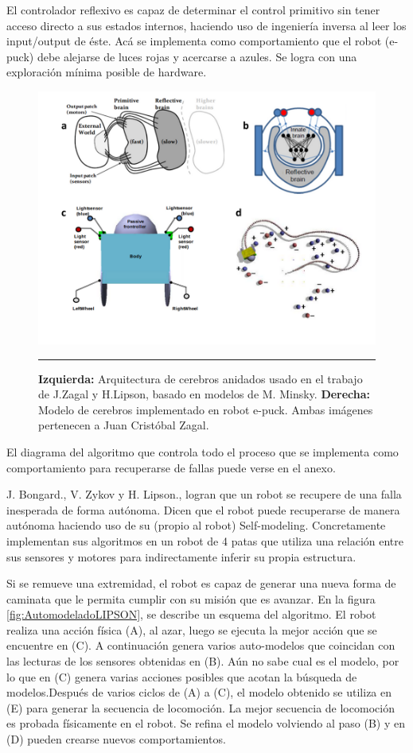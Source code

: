 El controlador reflexivo es capaz de determinar el control primitivo sin tener acceso directo a sus estados internos, haciendo uso de ingeniería inversa al leer los input/output de éste. Acá se implementa como comportamiento que el robot (e-puck) debe alejarse de luces rojas y acercarse a azules. Se logra con una exploración mínima posible de hardware.

\begin{figure}[htbp]
	\centering
		\includegraphics[width=\textwidth]{./Figures/automod.png}
		\rule{35em}{0.5pt}
	\caption[Automodelado]{\textbf{Izquierda:} Arquitectura de cerebros anidados usado en el trabajo de J.Zagal y H.Lipson, basado en modelos de M. Minsky. \textbf{Derecha:} Modelo de cerebros implementado en robot e-puck. Ambas imágenes  pertenecen a Juan Cristóbal Zagal.}
	\label{fig:AutomodeladoTest}
\end{figure}


El diagrama del algoritmo que controla todo el proceso que se implementa como comportamiento para recuperarse de fallas puede verse en el anexo.

J. Bongard., V. Zykov y H. Lipson., logran que un robot se recupere de una falla inesperada de forma autónoma. Dicen que el robot puede recuperarse de manera autónoma haciendo uso de su (propio al robot) Self-modeling. Concretamente implementan sus algoritmos en un robot de 4 patas que utiliza una relación entre sus sensores y motores para indirectamente inferir su propia estructura.


Si se remueve una extremidad, el robot es capaz de generar una nueva forma de caminata que le permita cumplir con su misión que es avanzar.
En la figura \ref{fig:AutomodeladoLIPSON}, se describe un esquema del algoritmo. El robot realiza una acción física (A), al azar, luego se ejecuta la mejor acción que se encuentre en (C). A continuación genera varios auto-modelos que coincidan con las lecturas de los sensores obtenidas en (B). Aún no sabe cual es el modelo, por lo que en (C) genera varias acciones posibles que acotan la búsqueda de modelos.Después de varios ciclos de (A) a (C),  el modelo obtenido se utiliza en (E) para generar la secuencia de locomoción. La mejor secuencia de locomoción es probada físicamente en el robot. Se refina el modelo volviendo al paso (B) y en (D) pueden crearse nuevos comportamientos.

